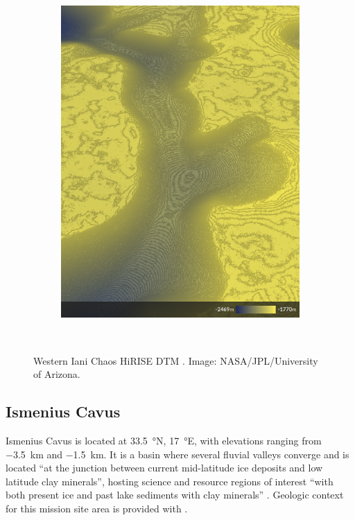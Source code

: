 \begin{figure}[h]
\begin{subfigure}[t]{\subfigureWidth}
        \includegraphics[height=\graphicsHeight]{sections/mars-solar-energy/mission-sites/images/western-iani-chaos-dtm-altimetry.png}
		\label{fig:sub:western-iani-chaos-dtm-altimetry}
	\end{subfigure}\\[0.8ex]
    \caption[Western Iani Chaos HiRISE digital terrain model]
            {Western Iani Chaos \ac{HiRISE} \ac{DTM} . Image: \ac{NASA}/\ac{JPL}/University of Arizona.}
    \label{fig:western-iani-chaos}
\vspace{-2ex}
\end{figure}

\clearpage
\subsection{Ismenius Cavus}
\label{sec:MissionSites:IsmeniusCavus}
Ismenius Cavus is located at \SI{33.5}{\degree}N, \SI{17}{\degree}E, with elevations ranging from \SI{-3.5}{\kilo\meter} and \SI{-1.5}{\kilo\meter}. It is a basin where several fluvial valleys converge and is located ``at the junction between current mid-latitude ice deposits and low latitude clay minerals'', hosting science and resource regions of interest ``with both present ice and past lake sediments with clay minerals''  . Geologic context for this mission site area is provided with .

